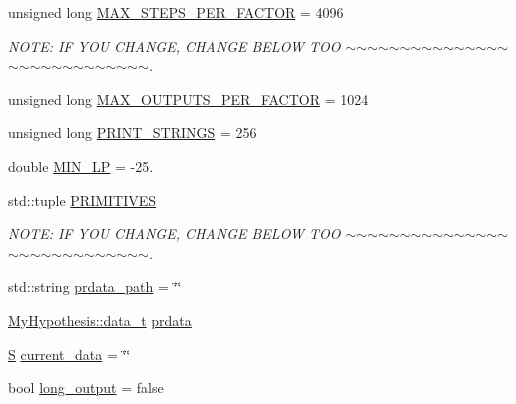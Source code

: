 \begin{DoxyCompactItemize}
\item 
unsigned long \hyperlink{_models_2_formal_language_theory-_complex_2_main_8cpp_a33cfa353d2570ba1bc9b45b924e890ff}{M\+A\+X\+\_\+\+S\+T\+E\+P\+S\+\_\+\+P\+E\+R\+\_\+\+F\+A\+C\+T\+OR} = 4096
\begin{DoxyCompactList}\small\item\em N\+O\+TE\+: IF Y\+OU C\+H\+A\+N\+GE, C\+H\+A\+N\+GE B\+E\+L\+OW T\+OO $\sim$$\sim$$\sim$$\sim$$\sim$$\sim$$\sim$$\sim$$\sim$$\sim$$\sim$$\sim$$\sim$$\sim$$\sim$$\sim$$\sim$$\sim$$\sim$$\sim$$\sim$$\sim$$\sim$$\sim$$\sim$$\sim$$\sim$$\sim$. \end{DoxyCompactList}\item 
unsigned long \hyperlink{_models_2_formal_language_theory-_complex_2_main_8cpp_a78ab994cd90dbad4d470e8b4082ef882}{M\+A\+X\+\_\+\+O\+U\+T\+P\+U\+T\+S\+\_\+\+P\+E\+R\+\_\+\+F\+A\+C\+T\+OR} = 1024
\item 
unsigned long \hyperlink{_models_2_formal_language_theory-_complex_2_main_8cpp_ad098fee1c76be478fe0683197334c489}{P\+R\+I\+N\+T\+\_\+\+S\+T\+R\+I\+N\+GS} = 256
\item 
double \hyperlink{_models_2_formal_language_theory-_complex_2_main_8cpp_aeefd72efb701ee22e6d0c6755d8596b2}{M\+I\+N\+\_\+\+LP} = -\/25.
\item 
std\+::tuple \hyperlink{_models_2_formal_language_theory-_complex_2_main_8cpp_a04e6d8e4b74d3f4fc965e5e5449158a3}{P\+R\+I\+M\+I\+T\+I\+V\+ES}
\begin{DoxyCompactList}\small\item\em N\+O\+TE\+: IF Y\+OU C\+H\+A\+N\+GE, C\+H\+A\+N\+GE B\+E\+L\+OW T\+OO $\sim$$\sim$$\sim$$\sim$$\sim$$\sim$$\sim$$\sim$$\sim$$\sim$$\sim$$\sim$$\sim$$\sim$$\sim$$\sim$$\sim$$\sim$$\sim$$\sim$$\sim$$\sim$$\sim$$\sim$$\sim$$\sim$$\sim$$\sim$. \end{DoxyCompactList}\item 
std\+::string \hyperlink{_models_2_formal_language_theory-_complex_2_main_8cpp_aad659d32cecc0fd81857e5dbb67e0b1c}{prdata\+\_\+path} = \char`\"{}\char`\"{}
\item 
\hyperlink{class_bayesable_aa2788c4d7718c0a824e1d28c4c98f921}{My\+Hypothesis\+::data\+\_\+t} \hyperlink{_models_2_formal_language_theory-_complex_2_main_8cpp_af877d2e50caacf995a851274343f46c5}{prdata}
\item 
\hyperlink{_models_2_formal_language_theory-_complex_2_main_8cpp_a51c40915539205f0b5add30b0d68a4cb}{S} \hyperlink{_models_2_formal_language_theory-_complex_2_main_8cpp_a7738aad53d0b772202992e9bad69c250}{current\+\_\+data} = \char`\"{}\char`\"{}
\item 
bool \hyperlink{_models_2_formal_language_theory-_complex_2_main_8cpp_a41b29b6499f37ab86060debf9c58d19f}{long\+\_\+output} = false
\end{DoxyCompactItemize}


